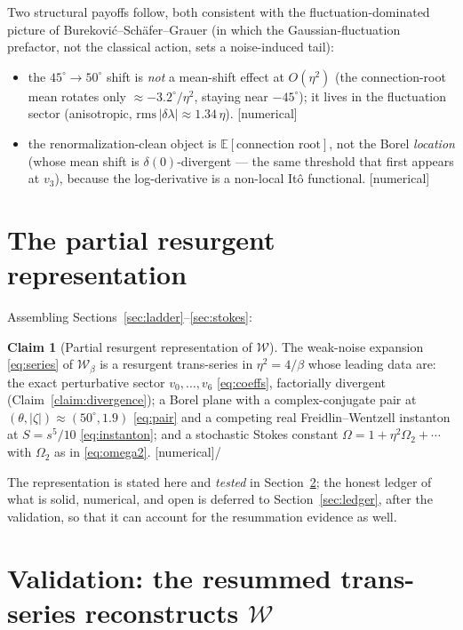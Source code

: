 \documentclass[11pt,reqno]{amsart}
\theoremstyle{plain}
\theoremstyle{definition}
\newtheorem{claim}[theorem]{Claim}
\theoremstyle{remark}
\newcommand{\E}{\mathbb{E}}
\newcommand{\W}{\mathcal{W}}
\newcommand{\tagN}{{\footnotesize\textsf{[numerical]}}}
\newcommand{\tagX}{{\footnotesize\textsf{[conjectural]}}}
\begin{document}
Two structural payoffs follow, both consistent with the fluctuation-dominated picture of
Burekovi\'c--Sch\"afer--Grauer (in which the Gaussian-fluctuation prefactor, not the classical
action, sets a noise-induced tail):
\begin{itemize}
\item[(a)] the $45^\circ\to50^\circ$ shift is \emph{not} a mean-shift effect at $O(\eta^2)$
(the connection-root mean rotates only $\approx-3.2^\circ/\eta^2$, staying near $-45^\circ$); it
lives in the fluctuation sector (anisotropic, $\mathrm{rms}\,|\delta\lambda|\approx1.34\,\eta$).
\tagN
\item[(b)] the renormalization-clean object is $\E[\text{connection root}]$, not the Borel
\emph{location} (whose mean shift is $\delta(0)$-divergent --- the same threshold that first
appears at $v_3$), because the log-derivative is a non-local It\^o functional. \tagN
\end{itemize}

\section{The partial resurgent representation}\label{sec:representation}

Assembling Sections~\ref{sec:ladder}--\ref{sec:stokes}:

\begin{claim}[Partial resurgent representation of $\W$]\label{claim:rep}
The weak-noise expansion \eqref{eq:series} of $\W_\beta$ is a resurgent trans-series in
$\eta^2=4/\beta$ whose leading data are: the exact perturbative sector $v_0,\dots,v_6$
\eqref{eq:coeffs}, factorially divergent (Claim~\ref{claim:divergence}); a Borel plane with a
complex-conjugate pair at $(\theta,|\zeta|)\approx(50^\circ,1.9)$ \eqref{eq:pair} and a
competing real Freidlin--Wentzell instanton at $S=s^5/10$ \eqref{eq:instanton}; and a
stochastic Stokes constant $\Omega=1+\eta^2\Omega_2+\cdots$ with $\Omega_2$ as in
\eqref{eq:omega2}. \tagN\;/\;\tagX
\end{claim}

The representation is stated here and \emph{tested} in Section~\ref{sec:resum}; the honest ledger
of what is solid, numerical, and open is deferred to Section~\ref{sec:ledger}, after the
validation, so that it can account for the resummation evidence as well.

\section{Validation: the resummed trans-series reconstructs $\W$}\label{sec:resum}
\end{document}
